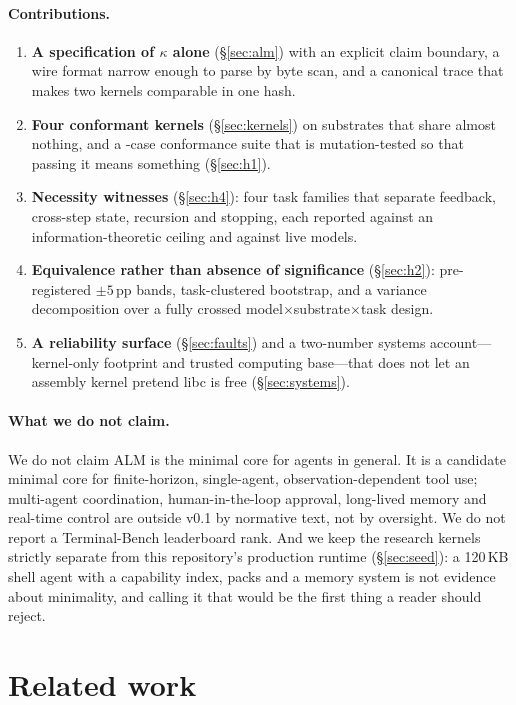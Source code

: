 \documentclass[11pt,a4paper]{article}
\begin{document}
\paragraph{Contributions.}
\begin{enumerate}
\item \textbf{A specification of $\kappa$ alone} (\S\ref{sec:alm}) with an
explicit claim boundary, a wire format narrow enough to parse by byte scan, and
a canonical trace that makes two kernels comparable in one hash.
\item \textbf{Four conformant kernels} (\S\ref{sec:kernels}) on substrates that
share almost nothing, and a \confcases-case conformance suite that is
mutation-tested so that passing it means something (\S\ref{sec:h1}).
\item \textbf{Necessity witnesses} (\S\ref{sec:h4}): four task families that
separate feedback, cross-step state, recursion and stopping, each reported
against an information-theoretic ceiling and against live models.
\item \textbf{Equivalence rather than absence of significance}
(\S\ref{sec:h2}): pre-registered $\pm5$\,pp bands, task-clustered bootstrap,
and a variance decomposition over a fully crossed
model$\times$substrate$\times$task design.
\item \textbf{A reliability surface} (\S\ref{sec:faults}) and a two-number
systems account---kernel-only footprint and trusted computing base---that does
not let an assembly kernel pretend libc is free (\S\ref{sec:systems}).
\end{enumerate}

\paragraph{What we do not claim.}
We do not claim ALM is the minimal core for agents in general. It is a
candidate minimal core for finite-horizon, single-agent, observation-dependent
tool use; multi-agent coordination, human-in-the-loop approval, long-lived
memory and real-time control are outside v0.1 by normative text, not by
oversight. We do not report a Terminal-Bench leaderboard rank. And we keep the
research kernels strictly separate from this repository's production runtime
(\S\ref{sec:seed}): a 120\,KB shell agent with a capability index, packs and a
memory system is not evidence about minimality, and calling it that would be
the first thing a reader should reject.

\section{Related work}
\end{document}
